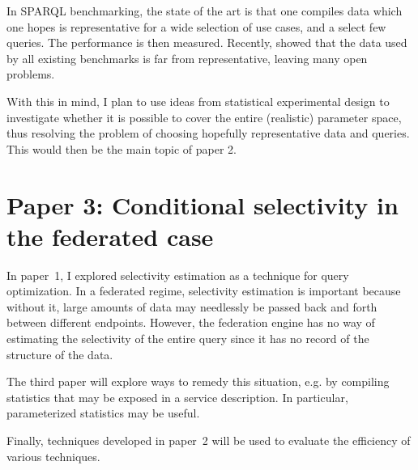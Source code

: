 \documentclass[a4paper,english,10pt]{article}
\begin{document}
In SPARQL benchmarking, the state of the art is that one compiles data
which one hopes is representative for a wide selection of use cases,
and a select few queries. The performance is then measured. Recently,
\cite{Duan:2011:AOC:1989323.1989340} showed that the data used by all
existing benchmarks is far from representative, leaving many open
problems.

With this in mind, I plan to use ideas from statistical experimental
design to investigate whether it is possible to cover the entire
(realistic) parameter space, thus resolving the problem of choosing
hopefully representative data and queries. This would then be the main
topic of paper 2.

\section*{Paper 3: Conditional selectivity in the federated case}

In paper~1, I explored selectivity estimation as a technique for query
optimization. In a federated regime, selectivity estimation is
important because without it, large amounts of data may needlessly be
passed back and forth between different endpoints. However, the
federation engine has no way of estimating the selectivity of the
entire query since it has no record of the structure of the data.

The third paper will explore ways to remedy this situation, e.g. by
compiling statistics that may be exposed in a service description. In
particular, parameterized statistics may be useful. 

Finally, techniques developed in paper~2 will be used to evaluate the
efficiency of various techniques.



\end{document}
